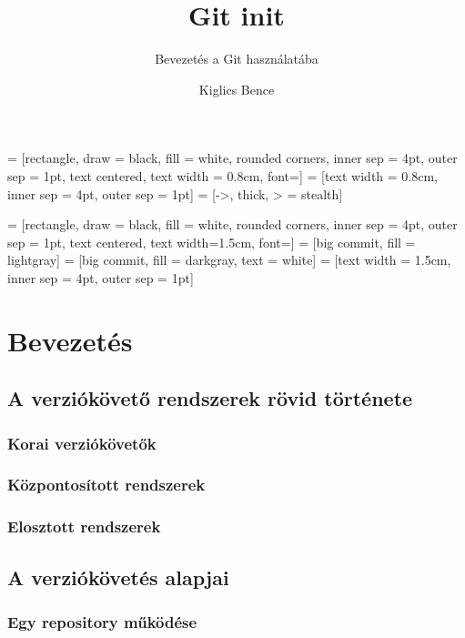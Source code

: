 \documentclass[display,t]{beamer}
\title{Git init}
\subtitle{Bevezetés a Git használatába}
\author{Kiglics Bence}
\begin{document}
 = [rectangle, draw = black, fill = white, rounded corners,
                      inner sep = 4pt, outer sep = 1pt, text centered,
                      text width = 0.8cm, font=\small]
 = [text width = 0.8cm, inner sep = 4pt, outer sep = 1pt]
 = [->, thick, > = stealth]

 = [rectangle, draw = black, fill = white, rounded corners,
                          inner sep = 4pt, outer sep = 1pt, text centered,
                          text width=1.5cm, font=\small]
     = [big commit, fill = lightgray]
        = [big commit, fill = darkgray, text = white]
 = [text width = 1.5cm, inner sep = 4pt, outer sep = 1pt]


\frame{\titlepage}



\section{Bevezetés}
\subsection{A verziókövető rendszerek rövid története}
\subsubsection{Korai verziókövetők}



\subsubsection{Központosított rendszerek}



\subsubsection{Elosztott rendszerek}




\subsection{A verziókövetés alapjai}
\subsubsection{Egy repository működése}
\end{document}
